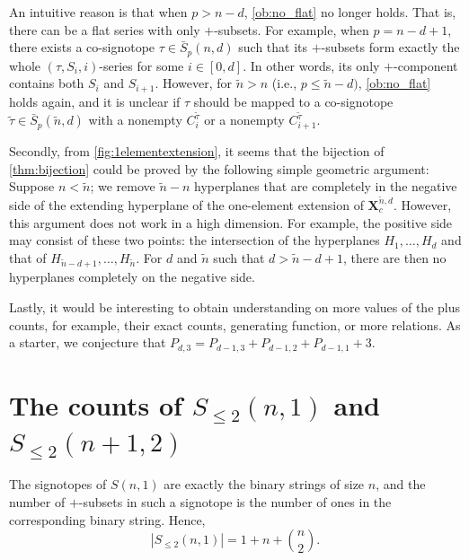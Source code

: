 \documentclass[a4paper,11pt]{amsart}
\newcommand{\tn}{\tilde{n}}
\begin{document}
An intuitive reason is that when $p > n-d$, \cref{ob:no_flat} no longer holds.
That is, there can be a flat series with only $+$-subsets.
For example, when $p = n-d+1$, there exists a co-signotope $\tau \in \bar{S}_{p}(n,d)$ such that its $+$-subsets form exactly the whole $(\tau,S_i,i)$-series for some $i \in [0,d]$.
In other words, its only $+$-component contains both $S_i$ and $S_{i+1}$.
However, for $\tn > n$ (i.e., $p \leq \tn-d)$, \cref{ob:no_flat} holds again, and it is unclear if $\tau$ should be mapped to a co-signotope $\tilde{\tau} \in \bar{S}_{p}(\tn,d)$ with a nonempty $C^{\tilde{\tau}}_i$ or
a nonempty $C^{\tilde{\tau}}_{i+1}$.

Secondly, from \cref{fig:1elementextension}, it seems that the bijection of \cref{thm:bijection} could be proved by the following simple geometric argument:
Suppose $n < \tn$; 
we remove $\tn-n$ hyperplanes that are completely in the negative side of the extending hyperplane of the one-element extension of $\mathbf{X}^{\tn,d}_c$.
However, this argument does not work in a high dimension.
For example, the positive side may consist of these two points: the intersection of the hyperplanes $H_1, \dots, H_d$ and that of $H_{\tn-d+1}, \dots, H_{\tn}$.
For $d$ and $\tn$ such that $d > \tn - d + 1$, there are then no hyperplanes completely on the negative side.

Lastly, it would be interesting to obtain understanding on more values of the plus counts, for example, their exact counts, generating function, or more relations.
As a starter, we conjecture that $P_{d,3} = P_{d-1,3} + P_{d-1,2} + P_{d-1,1} + 3$.

\appendix

\section{The counts of $S_{\leq 2}(n,1)$ and $S_{\leq 2}(n+1,2)$}
\label{app:tightness}

The signotopes of $S(n,1)$ are exactly the binary strings of size $n$, and the number of $+$-subsets in such a signotope is the number of ones in the corresponding binary string.
Hence, 
\[
    |S_{\leq 2}(n,1)| = 1 + n + {n \choose 2}.
\]
\end{document}
